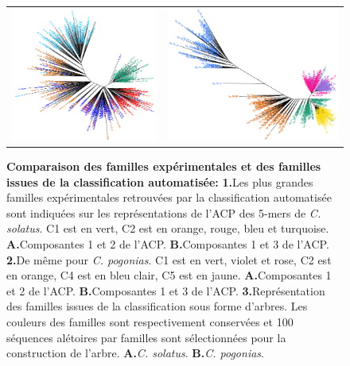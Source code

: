 \documentclass[12pt,a4paper]{article}
\begin{document}
\begin{figure}
\begin{tabular}{cc}
		\includegraphics[scale=0.4]{img/tree_solatus.png} &  \includegraphics[scale=0.4]{img/tree_pogonias.png} \\
	\end{tabular}
	\caption{\textbf{Comparaison des familles expérimentales et des familles issues de la classification automatisée:}
	\textbf{1.}Les plus grandes familles expérimentales retrouvées par la classification automatisée sont indiquées sur les représentations de l'ACP des 5-mers de \textit{C. solatus}. C1 est en vert, C2 est en orange, rouge, bleu et turquoise.  \textbf{A.}Composantes 1 et 2 de l'ACP. \textbf{B.}Composantes 1 et 3 de l'ACP. 
	\textbf{2.}De même pour \textit{C. pogonias}. C1 est en vert, violet et rose, C2 est en orange, C4 est en bleu clair, C5 est en jaune. \textbf{A.}Composantes 1 et 2 de l'ACP. \textbf{B.}Composantes 1 et 3 de l'ACP. 
	\textbf{3.}Représentation des familles issues de la classification sous forme d'arbres. Les couleurs des familles sont respectivement conservées et 100 séquences alétoires par familles sont sélectionnées pour la construction de l'arbre. \textbf{A.}\textit{C. solatus}. \textbf{B.}\textit{C. pogonias}.
	\label{fig:so_po_acp_tree}
		} 
\end{figure}
\end{document}
